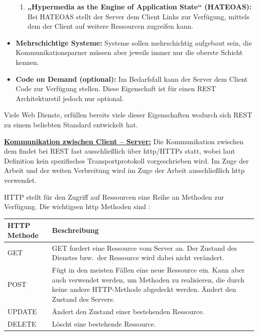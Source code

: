 \begin{itemize}
\begin{enumerate}
		\item \textbf{„Hypermedia as the Engine of Application State“ (HATEOAS):} 
		Bei HATEOAS stellt der Server dem Client Links zur Verfügung, mittels dem der Client auf weitere Ressourcen zugreifen kann.
	\end{enumerate}
	
	\item \textbf{Mehrschichtige Systeme:}
	Systeme sollen mehrschichtig aufgebaut sein, die Kommunikationsparner müssen aber jeweils immer nur die oberste Schicht kennen.
	
	\item \textbf{Code on Demand (optional):}
	Im Bedarfsfall kann der Server dem Client Code zur Verfügung stellen. Diese Eigenschaft ist für einen REST Architekturstil jedoch nur optional.
\end{itemize}

Viele Web Dienste, erfüllen bereits viele dieser Eigenschaften wodurch sich REST zu einem beliebten Standard entwickelt hat.

\textbf{\underline{Kommunikation zwischen Client – Server:}}
Die Kommunikation zwischen dem findet bei REST fast ausschließlich über http/HTTPs statt, wobei laut Definition kein spezifisches Transportprotokoll vorgeschrieben wird. Im Zuge der Arbeit und der weiten Verbreitung wird im Zuge der Arbeit ausschließlich http verwendet.

HTTP stellt für den Zugriff auf Ressourcen eine Reihe an Methoden zur Verfügung. Die wichtigsen http Methoden sind : \newline

\begin{tabularx}{\textwidth}{|l|X|}
	\hline
	\textbf{HTTP Methode} & \textbf{Beschreibung} \\
	\hline
	GET & GET fordert eine Ressource vom Server an. Der Zustand des Dienstes bzw.\ der Ressource wird dabei nicht verändert. \\
	\hline
	POST & Fügt in den meisten Fällen eine neue Ressource ein. Kann aber auch verwendet werden, um Methoden zu realisieren, die durch keine andere HTTP-Methode abgedeckt werden. Ändert den Zustand des Servers. \\
	\hline
	UPDATE & Ändert den Zustand einer bestehenden Ressource. \\
	\hline
	DELETE & Löscht eine bestehende Ressource. \\
	\hline
\end{tabularx} \newline


